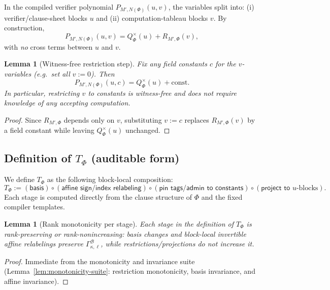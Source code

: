 \documentclass[12pt]{article}
\newtheorem{lemma}[theorem]{Lemma}
\theoremstyle{definition}
\theoremstyle{definition}
\theoremstyle{remark}
\theoremstyle{remark}
\begin{document}
In the compiled verifier polynomial $P_{M',N(\Phi)}(u,v)$, the variables split into:
(i) verifier/clause-sheet blocks $u$ and (ii) computation-tableau blocks $v$.
By construction,
\[
P_{M',N(\Phi)}(u,v) = Q^{\times}_{\Phi}(u) + R_{M',\Phi}(v),
\]
with \emph{no} cross terms between $u$ and $v$.

\begin{lemma}[Witness-free restriction step]
\label{lem:witness-free-restriction}
Fix any field constants $c$ for the $v$-variables (e.g.\ set all $v:=0$).
Then
\[
P_{M',N(\Phi)}(u,c) = Q^{\times}_{\Phi}(u) + \mathrm{const}.
\]
In particular, restricting $v$ to constants is \emph{witness-free} and does
not require knowledge of any accepting computation.
\end{lemma}

\begin{proof}
Since $R_{M',\Phi}$ depends only on $v$, substituting $v:=c$ replaces
$R_{M',\Phi}(v)$ by a field constant while leaving $Q^{\times}_{\Phi}(u)$ unchanged.
\end{proof}

\subsection{Definition of $T_{\Phi}$ (auditable form)}
\label{subsec:definition-of-tphi}

We define $T_{\Phi}$ as the following block-local composition:
\[
T_{\Phi} := (\textsf{basis}) \circ (\textsf{affine sign/index relabeling})
\circ (\textsf{pin tags/admin to constants}) \circ (\textsf{project to }u\text{-blocks}).
\]
Each stage is computed directly from the clause structure of $\Phi$ and the
fixed compiler templates.

\begin{lemma}[Rank monotonicity per stage]
\label{lem:tphi-rank-stages}
Each stage in the definition of $T_{\Phi}$ is rank-preserving or rank-nonincreasing:
basis changes and block-local invertible affine relabelings preserve
$\Gamma^{\mathcal{B}}_{\kappa,\ell}$, while restrictions/projections do not increase it.
\end{lemma}

\begin{proof}
Immediate from the monotonicity and invariance suite
(Lemma~\ref{lem:monotonicity-suite}: restriction monotonicity, basis invariance, and affine invariance).
\end{proof}

\end{document}
